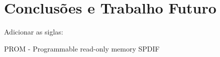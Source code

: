 \chapter{Conclusões e Trabalho Futuro} \label{chap:concl}

Adicionar as siglas:

PROM - Programmable read-only memory
SPDIF